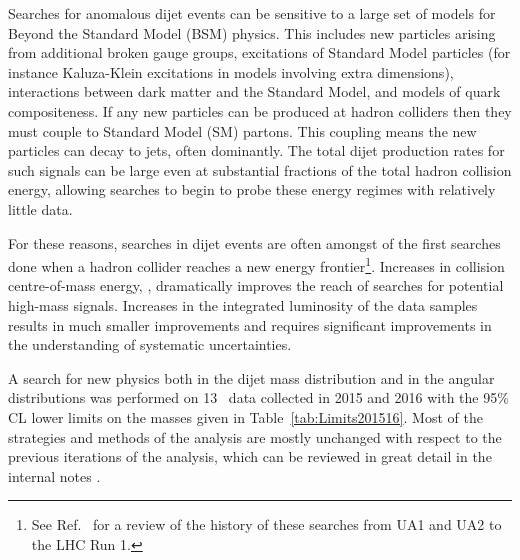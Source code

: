 Searches for anomalous dijet events can be sensitive to a large set of models for Beyond the Standard Model (BSM) physics.
This includes new particles arising from additional broken gauge groups,
excitations of Standard Model particles (for instance Kaluza-Klein excitations in models involving extra dimensions),
interactions between dark matter and the Standard Model, and models of quark compositeness.
If any new particles can be produced at hadron colliders then they must couple to Standard Model (SM) partons.
This coupling means the new particles can decay to jets, often dominantly.
The total dijet production rates for such signals can be large even at substantial fractions of the
total hadron collision energy, allowing searches to begin to probe these energy regimes with relatively little data.

For these reasons, searches in dijet events are often amongst of the first searches done when a hadron
collider reaches a new energy frontier\footnote{See Ref.~\cite{Harris:2011bh} for a review of the history
of these searches from UA1 and UA2 to the LHC Run 1.}.  Increases in collision centre-of-mass energy, \s , 
dramatically improves the reach of searches for potential high-mass signals. 
Increases in the integrated luminosity of the data samples results in much smaller improvements and requires significant 
improvements in the understanding of systematic uncertainties. 

A search for new physics both in the dijet mass distribution and in the angular distributions was performed on 13~\TeV\xspace data collected in 2015 and 2016 \cite{EXOT-2016-21} with the  95\% CL lower limits on the masses given in Table~\ref{tab:Limits201516}. 
Most of the strategies and methods of the analysis are mostly unchanged with respect to the previous iterations of the analysis, which can be reviewed in great detail in the internal
notes \cite{Bauce:2226443}.




